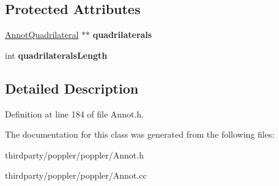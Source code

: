 \subsection*{Protected Attributes}
\begin{DoxyCompactItemize}
\item 
\mbox{\label{class_annot_quadrilaterals_a232664b28e61d2c7eeb487ddab73b907}} 
\hyperlink{class_annot_quadrilaterals_1_1_annot_quadrilateral}{Annot\+Quadrilateral} $\ast$$\ast$ {\bfseries quadrilaterals}
\item 
\mbox{\label{class_annot_quadrilaterals_ace8ffd597e5f8de13653fa2d4f227c26}} 
int {\bfseries quadrilaterals\+Length}
\end{DoxyCompactItemize}


\subsection{Detailed Description}


Definition at line 184 of file Annot.\+h.



The documentation for this class was generated from the following files\+:\begin{DoxyCompactItemize}
\item 
thirdparty/poppler/poppler/Annot.\+h\item 
thirdparty/poppler/poppler/Annot.\+cc\end{DoxyCompactItemize}
